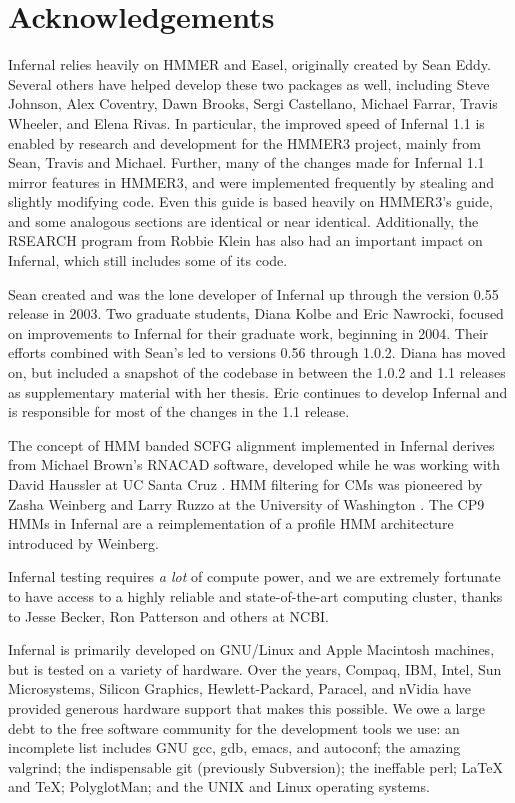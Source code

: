 \section{Acknowledgements}

Infernal relies heavily on HMMER and Easel, originally created by Sean
Eddy. Several others have helped develop these two packages as well,
including Steve Johnson, Alex Coventry, Dawn Brooks, Sergi Castellano,
Michael Farrar, Travis Wheeler, and Elena Rivas.  In particular, the
improved speed of Infernal 1.1 is enabled by research and development
for the HMMER3 project, mainly from Sean, Travis and Michael. Further,
many of the changes made for Infernal 1.1 mirror features in HMMER3,
and were implemented frequently by stealing and slightly modifying
code. Even this guide is based heavily on HMMER3's guide, and some
analogous sections are identical or near identical.  Additionally, the
RSEARCH program \citep{KleinEddy03} from Robbie Klein has also had an
important impact on Infernal, which still includes some of its code.

Sean created and was the lone developer of Infernal up through the
version 0.55 release in 2003. Two graduate students, Diana Kolbe and
Eric Nawrocki, focused on improvements to Infernal for their graduate
work, beginning in 2004. Their efforts combined with Sean's led to
versions 0.56 through 1.0.2. Diana has moved on, but
included a snapshot of the codebase in between the 1.0.2 and 1.1
releases as supplementary material with her thesis. Eric continues to
develop Infernal and is responsible for most of the changes in the 1.1
release.

The concept of HMM banded SCFG alignment implemented in Infernal
derives from Michael Brown's RNACAD software, developed while he was
working with David Haussler at UC Santa Cruz \citep{Brown00}. HMM
filtering for CMs was pioneered by Zasha Weinberg and Larry Ruzzo at
the University of Washington
\citep{WeinbergRuzzo04,WeinbergRuzzo04b,WeinbergRuzzo06}. The CP9 HMMs
in Infernal are a reimplementation of a profile HMM architecture
introduced by Weinberg.

Infernal testing requires \emph{a lot} of compute power, and we are
extremely fortunate to have access to a highly reliable and
state-of-the-art computing cluster, thanks to Jesse Becker, Ron
Patterson and others at NCBI.

Infernal is primarily developed on GNU/Linux and Apple Macintosh
machines, but is tested on a variety of hardware. Over the years,
Compaq, IBM, Intel, Sun Microsystems, Silicon Graphics,
Hewlett-Packard, Paracel, and nVidia have provided generous hardware
support that makes this possible. We owe a large debt to the free
software community for the development tools we use: an incomplete
list includes GNU gcc, gdb, emacs, and autoconf; the amazing valgrind;
the indispensable git (previously Subversion); the ineffable perl;
LaTeX and TeX; PolyglotMan; and the UNIX and Linux operating systems.

\label{manualend}
